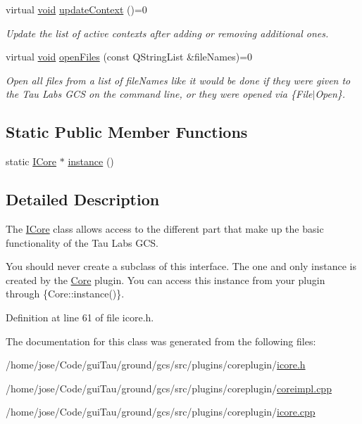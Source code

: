 \begin{DoxyCompactItemize}
virtual \hyperlink{group___u_a_v_objects_plugin_ga444cf2ff3f0ecbe028adce838d373f5c}{void} \hyperlink{group___core_plugin_ga6c04b622e19d7eb2e2227f450414cbd1}{update\-Context} ()=0
\begin{DoxyCompactList}\small\item\em Update the list of active contexts after adding or removing additional ones. \end{DoxyCompactList}\item 
virtual \hyperlink{group___u_a_v_objects_plugin_ga444cf2ff3f0ecbe028adce838d373f5c}{void} \hyperlink{group___core_plugin_gaa2b7ab1cb01663d235c45706ffd38d1d}{open\-Files} (const Q\-String\-List \&file\-Names)=0
\begin{DoxyCompactList}\small\item\em Open all files from a list of {\itshape file\-Names} like it would be done if they were given to the Tau Labs G\-C\-S on the command line, or they were opened via \{File$|$\-Open\}. \end{DoxyCompactList}\end{DoxyCompactItemize}
\subsection*{Static Public Member Functions}
\begin{DoxyCompactItemize}
\item 
static \hyperlink{class_core_1_1_i_core}{I\-Core} $\ast$ \hyperlink{group___core_plugin_ga71099762904aac0b404fcd1f93bdc83e}{instance} ()
\end{DoxyCompactItemize}


\subsection{Detailed Description}
The \hyperlink{class_core_1_1_i_core}{I\-Core} class allows access to the different part that make up the basic functionality of the Tau Labs G\-C\-S. 

You should never create a subclass of this interface. The one and only instance is created by the \hyperlink{namespace_core}{Core} plugin. You can access this instance from your plugin through {\ttfamily }\{Core\-::instance()\}.

Definition at line 61 of file icore.\-h.



The documentation for this class was generated from the following files\-:\begin{DoxyCompactItemize}
\item 
/home/jose/\-Code/gui\-Tau/ground/gcs/src/plugins/coreplugin/\hyperlink{icore_8h}{icore.\-h}\item 
/home/jose/\-Code/gui\-Tau/ground/gcs/src/plugins/coreplugin/\hyperlink{coreimpl_8cpp}{coreimpl.\-cpp}\item 
/home/jose/\-Code/gui\-Tau/ground/gcs/src/plugins/coreplugin/\hyperlink{icore_8cpp}{icore.\-cpp}\end{DoxyCompactItemize}
